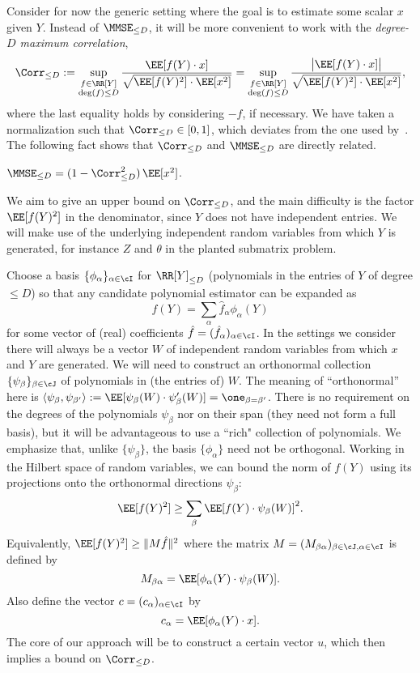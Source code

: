 \documentclass[11pt]{article}
\begin{document}
Consider for now the generic setting where the goal is to estimate some scalar $x$ given $Y$. Instead of $\MMSE_{\le D}$, it will be more convenient to work with the \emph{degree-$D$ maximum correlation},
\[ \Corr_{\le D} := \sup_{\substack{f \in \RR[Y] \\ \deg(f) \le D}} \frac{\EE[f(Y) \cdot x]}{\sqrt{\EE[f(Y)^2] \cdot \EE[x^2]}}=\sup_{\substack{f \in \RR[Y] \\ \deg(f) \le D}} \frac{\big|\EE[f(Y) \cdot x]\big|}{\sqrt{\EE[f(Y)^2] \cdot \EE[x^2]}} , \]
where the last equality holds by considering $-f$, if necessary. We have taken a normalization such that $\Corr_{\le D} \in [0,1]$, which deviates from the one used by~\cite{SW-estimation}. The following fact shows that $\Corr_{\le D}$ and $\MMSE_{\le D}$ are directly related.
\begin{fact}
\label{fact}
$\MMSE_{\le D} = (1 - \Corr_{\le D}^2) \, \EE[x^2]$.
\end{fact}

\noindent We aim to give an upper bound on $\Corr_{\le D}$, and the main difficulty is the factor $\EE[f(Y)^2]$ in the denominator, since $Y$ does not have independent entries. We will make use of the underlying independent random variables from which $Y$ is generated, for instance $Z$ and $\theta$ in the planted submatrix problem.

Choose a basis $\{\phi_\alpha\}_{\alpha \in \cI}$ for $\RR[Y]_{\le D}$ (polynomials in the entries of $Y$ of degree $\le D$) so that any candidate polynomial estimator can be expanded as
\[ f(Y) = \sum_\alpha \hat{f}_\alpha \phi_\alpha(Y) \]
for some vector of (real) coefficients $\hat{f} = (\hat{f}_\alpha)_{\alpha \in \cI}$. In the settings we consider there will always be a vector $W$ of independent random variables from which $x$ and $Y$ are generated. We will need to construct an orthonormal collection $\{\psi_\beta\}_{\beta \in \cJ}$ of polynomials in (the entries of) $W$. The meaning of ``orthonormal'' here is $\langle \psi_\beta, \psi_{\beta'} \rangle := \EE[\psi_\beta(W) \cdot \psi_\beta'(W)] = \one_{\beta = \beta'}$. There is no requirement on the degrees of the polynomials $\psi_\beta$ nor on their span (they need not form a full basis), but it will be advantageous to use a ``rich" collection of polynomials. We emphasize that, unlike $\{\psi_\beta\}$, the basis $\{\phi_\alpha\}$ need not be orthogonal. Working in the Hilbert space of random variables, we can bound the norm of $f(Y)$ using its projections onto the orthonormal directions $\psi_\beta$:
\[ \EE[f(Y)^2] \ge \sum_\beta \EE[f(Y) \cdot \psi_\beta(W)]^2. \]
Equivalently, $\EE[f(Y)^2] \ge \|M \hat f\|^2$ where the matrix $M = (M_{\beta\alpha})_{\beta \in \cJ, \alpha \in \cI}$ is defined by
\[ M_{\beta\alpha} = \EE[\phi_\alpha(Y) \cdot \psi_\beta(W)]. \]
Also define the vector $c = (c_\alpha)_{\alpha \in \cI}$ by
\[ c_\alpha = \EE[\phi_\alpha(Y) \cdot x]. \]
The core of our approach will be to construct a certain vector $u$, which then implies a bound on $\Corr_{\le D}$.
\end{document}
